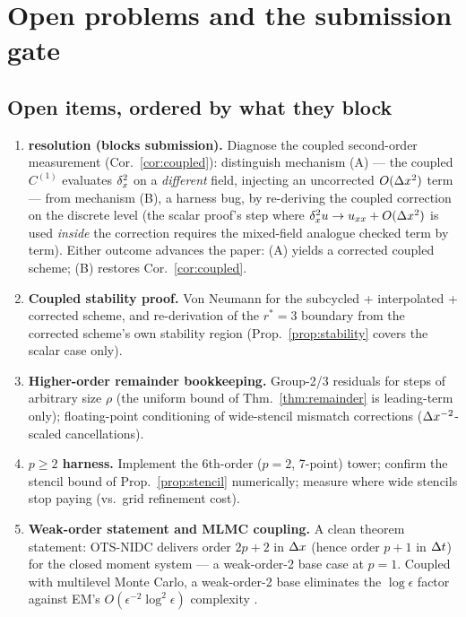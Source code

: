 \section{Open problems and the submission gate}\label{sec:open}

\subsection{Open items, ordered by what they block}

\begin{enumerate}
\item \textbf{\tagC resolution (blocks submission).}\label{open:coupled}
Diagnose the coupled second-order measurement (Cor.~\ref{cor:coupled}):
distinguish mechanism (A) --- the coupled $C^{(1)}$ evaluates $\delta_x^2$ on a
\emph{different} field, injecting an uncorrected $O(\Delta x^2)$ term --- from
mechanism (B), a harness bug, by re-deriving the coupled correction on the
discrete level (the scalar proof's step where $\delta_x^2 u \to u_{xx}+O(\Delta x^2)$ is
used \emph{inside} the correction requires the mixed-field analogue checked
term by term). Either outcome advances the paper: (A) yields a corrected
coupled scheme; (B) restores Cor.~\ref{cor:coupled}.

\item \textbf{Coupled stability proof.}\label{open:stab}
Von Neumann for the subcycled + interpolated + corrected scheme, and
re-derivation of the $r^\ast=3$ boundary from the corrected scheme's own
stability region (Prop.~\ref{prop:stability} covers the scalar case only).

\item \textbf{Higher-order remainder bookkeeping.}\label{open:higher}
Group-2/3 residuals for steps of arbitrary size $\rho$ (the uniform bound of
Thm.~\ref{thm:remainder} is leading-term only); floating-point conditioning of
wide-stencil mismatch corrections ($\Delta x^{-2}$-scaled cancellations).

\item \textbf{$p\ge2$ harness.}\label{open:p2}
Implement the 6th-order ($p=2$, 7-point) tower; confirm the stencil bound of
Prop.~\ref{prop:stencil} numerically; measure where wide stencils stop paying
(vs.\ grid refinement cost).

\item \textbf{Weak-order statement and MLMC coupling.}\label{open:mlmc}
A clean theorem statement: OTS-NIDC delivers order $2p+2$ in $\Delta x$ (hence
order $p+1$ in $\Delta t$) for the closed moment system --- a weak-order-2 base
case at $p=1$. Coupled with multilevel Monte Carlo, a weak-order-2 base
eliminates the $\log\epsilon$ factor against EM's $O(\epsilon^{-2}\log^2
\epsilon)$ complexity \tagO.


\end{enumerate}
